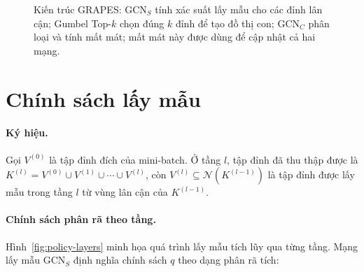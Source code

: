 \begin{figure}[htbp]
{}
\caption{Kiến trúc GRAPES: $\text{GCN}_S$ tính xác suất lấy mẫu cho các đỉnh lân cận; Gumbel Top-$k$ chọn đúng $k$ đỉnh để tạo đồ thị con; $\text{GCN}_C$ phân loại và tính mất mát; mất mát này được dùng để cập nhật cả hai mạng.}
\label{fig:grapes-arch}
\end{figure}

\section{Chính sách lấy mẫu}
\label{sec:grapes-policy}

\paragraph{Ký hiệu.} Gọi $V^{(0)}$
 là tập đỉnh đích của mini-batch. Ở tầng $l$, tập đỉnh đã thu thập được là $K^{(l)} = V^{(0)} \cup V^{(1)} \cup \cdots \cup V^{(l)}$, còn $V^{(l)} \subseteq \mathcal{N}(K^{(l-1)})$ là tập đỉnh được lấy mẫu trong tầng $l$ từ vùng lân cận của $K^{(l-1)}$.

\paragraph{Chính sách phân rã theo tầng.} Hình~\ref{fig:policy-layers} minh họa quá trình lấy mẫu tích lũy qua từng tầng. Mạng lấy mẫu $\text{GCN}_S$ định nghĩa chính sách $q$ theo dạng phân rã tích:

